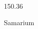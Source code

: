 \documentclass[12pt]{article}
\begin{document}
\hfill{}
\vfill
\begin{center}
  {\fontsize{50}{60}
  }

  \vspace{1em}

  150.36

Samarium
\end{center}
\vfill
\end{document}
